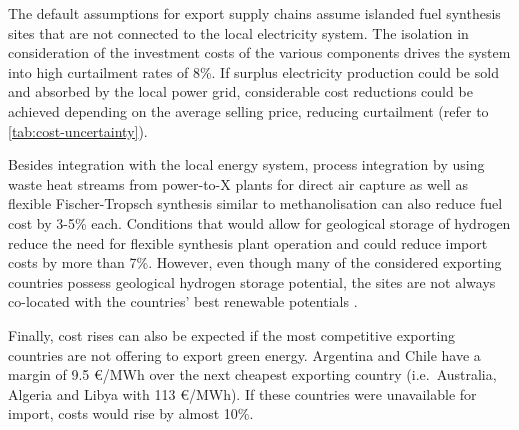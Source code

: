 The default assumptions for export supply chains assume islanded fuel synthesis
sites that are not connected to the local electricity system. The isolation in
consideration of the investment costs of the various components drives the
system into high curtailment rates of 8\%. If surplus electricity production
could be sold and absorbed by the local power grid, considerable cost reductions
could be achieved depending on the average selling price, reducing curtailment
(refer to \cref{tab:cost-uncertainty}). 

Besides integration with the local energy system, process integration by using
waste heat streams from power-to-X plants for direct air capture as well as
flexible Fischer-Tropsch synthesis similar to methanolisation can also reduce
fuel cost by 3-5\% each. Conditions that would allow for geological storage of
hydrogen reduce the need for flexible synthesis plant operation and could reduce
import costs by more than 7\%. However, even though many of the considered
exporting countries possess geological hydrogen storage potential, the sites are
not always co-located with the countries' best renewable potentials
\cite{hevinUndergroundStorage2019}.

Finally, cost rises can also be expected if the most competitive exporting
countries are not offering to export green energy. Argentina and Chile have a
margin of 9.5 \euro{}/MWh over the next cheapest exporting country (i.e.~Australia,
Algeria and Libya with 113 \euro{}/MWh). If these countries were unavailable for
import, costs would rise by almost 10\%.

